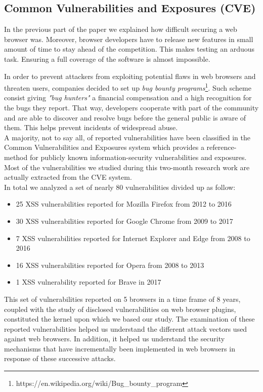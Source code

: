 \documentclass[journal]{IEEEtran}
\begin{document}
\subsection{Common Vulnerabilities and Exposures (CVE)}

In the previous part of the paper we explained how difficult securing a web browser was. Moreover, browser developers have to release new features in small amount of time to stay ahead of the competition. This makes testing an arduous task. Ensuring a full coverage of the software is almost impossible.

\medskip

In order to prevent attackers from exploiting potential flaws in web browsers and threaten users, companies decided to set up \emph{bug bounty programs}\footnote{https://en.wikipedia.org/wiki/Bug\_bounty\_program}. Such scheme consist giving \emph{"bug hunters"} a financial compensation and a high recognition for the bugs they report. That way, developers cooperate with part of the community and are able to discover and resolve bugs before the general public is aware of them. This helps prevent incidents of widespread abuse. \\
A majority, not to say all, of reported vulnerabilities have been classified in the Common Vulnerabilities and Exposures system which provides a reference-method for publicly known information-security vulnerabilities and exposures. \\

Most of the vulnerabilities we studied during this two-month research work are actually extracted from the CVE system. \\

In total we analyzed a set of nearly 80 vulnerabilities divided up as follow:

\begin{itemize}
\item 25 XSS vulnerabilities reported for Mozilla Firefox from 2012 to 2016
\item 30 XSS vulnerabilities reported for Google Chrome from 2009 to 2017
\item 7 XSS vulnerabilities reported for Internet Explorer and Edge from 2008 to 2016
\item 16 XSS vulnerabilities reported for Opera from 2008 to 2013
\item 1 XSS vulnerability reported for Brave in 2017
\end{itemize}

This set of vulnerabilities reported on 5 browsers in a time frame of 8 years, coupled with the study of disclosed vulnerabilities on web browser plugins, constituted the kernel upon which we based our study. The examination of these reported vulnerabilities helped us understand the different attack vectors used against web browsers. In addition, it helped us understand the security mechanisms that have incrementally been implemented in web browsers in response of these successive attacks.
\end{document}
